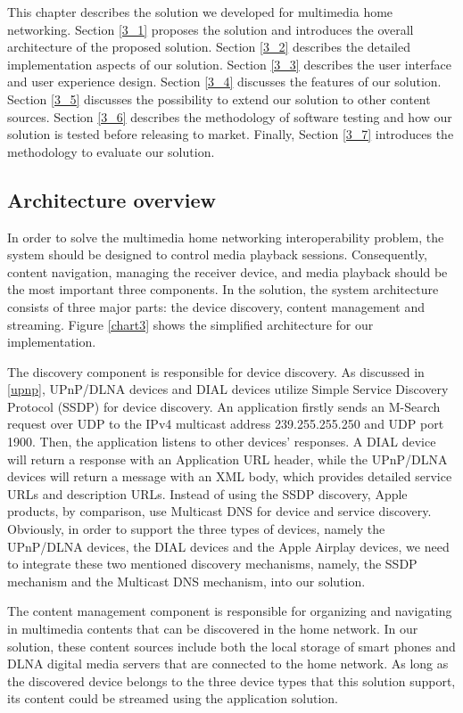 This chapter describes the solution we developed for multimedia home networking.
Section \ref{3_1} proposes the solution and introduces the overall architecture
of the proposed solution. Section \ref{3_2} describes the detailed
implementation aspects of our solution. Section \ref{3_3} describes the user
interface and user experience design. Section \ref{3_4} discusses the features
of our solution. Section \ref{3_5} discusses the possibility to extend our
solution to other content sources. Section \ref{3_6} describes the methodology
of software testing and how our solution is tested before releasing to market.
Finally, Section \ref{3_7} introduces the methodology to evaluate our solution.

\subsection{Architecture overview\label{3_1}}
In order to solve the multimedia home networking interoperability problem, the
system should be designed to control media playback sessions. Consequently,
content navigation, managing the receiver device, and media playback should be
the most important three components. In the solution, the system architecture
consists of three major parts: the device discovery, content management and streaming.
Figure \ref{chart3} shows the simplified architecture for our implementation.

The discovery component is responsible for device discovery. As discussed
in \ref{upnp}, UPnP/DLNA devices and DIAL devices utilize Simple Service Discovery
Protocol (SSDP) for device discovery. An application firstly sends an M-Search
request over UDP to the IPv4 multicast address 239.255.255.250 and UDP port
1900. Then, the application listens to other devices' responses. A DIAL device
will return a response with an Application URL header, while the UPnP/DLNA
devices will return a message with an XML body, which provides detailed service
URLs and description URLs. Instead of using the SSDP discovery, Apple products,
by comparison, use Multicast DNS for device and service discovery. Obviously,
in order to support the three types of devices, namely the UPnP/DLNA devices,
the DIAL devices and the Apple Airplay devices, we need to integrate these two
mentioned discovery mechanisms, namely, the SSDP mechanism and the Multicast
DNS mechanism, into our solution.

The content management component is responsible for organizing and navigating
in multimedia contents that can be discovered in the home network. In our
solution, these content sources include both the local storage of smart phones
and DLNA digital media servers that are connected to the home network. As long
as the discovered device belongs to the three device types that this solution
support, its content could be streamed using the application solution.

